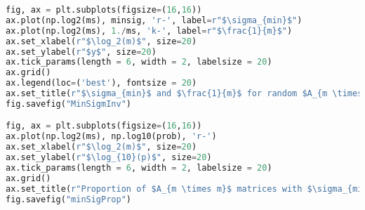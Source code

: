 \documentclass{article}
\begin{document}
\begin{lstlisting}[language=python]
fig, ax = plt.subplots(figsize=(16,16))
ax.plot(np.log2(ms), minsig, 'r-', label=r"$\sigma_{min}$")
ax.plot(np.log2(ms), 1./ms, 'k-', label=r"$\frac{1}{m}$")
ax.set_xlabel(r"$\log_2(m)$", size=20)
ax.set_ylabel(r"$y$", size=20)
ax.tick_params(length = 6, width = 2, labelsize = 20)
ax.grid()
ax.legend(loc=('best'), fontsize = 20)
ax.set_title(r"$\sigma_{min}$ and $\frac{1}{m}$ for random $A_{m \times m}$", size=20)
fig.savefig("MinSigmInv")

fig, ax = plt.subplots(figsize=(16,16))
ax.plot(np.log2(ms), np.log10(prob), 'r-')
ax.set_xlabel(r"$\log_2(m)$", size=20)
ax.set_ylabel(r"$\log_{10}(p)$", size=20)
ax.tick_params(length = 6, width = 2, labelsize = 20)
ax.grid()
ax.set_title(r"Proportion of $A_{m \times m}$ matrices with $\sigma_{min} < \frac{1}{m}$", size=20)
fig.savefig("minSigProp")

\end{lstlisting}
			
\end{document}
